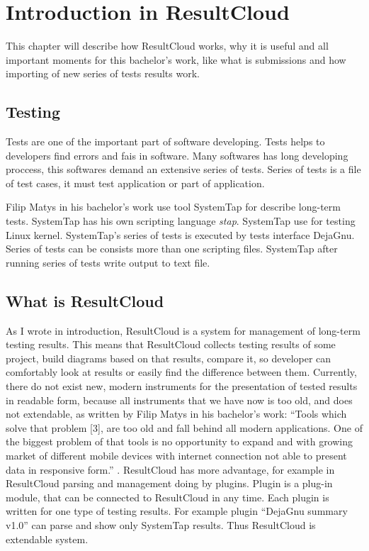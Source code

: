 \chapter{Introduction in ResultCloud}
\label{ch:resultcloud}

This chapter will describe how ResultCloud works, why it is useful and all important moments for this bachelor's work, like what is submissions and how importing of new series of tests results work.

\section{Testing}

Tests are one of the important part of software developing. Tests helps to developers find errors and fais in software. Many softwares has long developing proccess, this softwares demand an extensive series of tests. Series of tests is a file of test cases, it must test application or part of application.

Filip Matys in his bachelor's work use tool SystemTap for describe long-term tests. SystemTap has his own scripting language \emph{stap}. SystemTap use for testing Linux kernel. SystemTap's series of tests is executed by tests interface DejaGnu. Series of tests can be consists more than one scripting files. SystemTap after running series of tests write output to text file.  

\section{What is ResultCloud}

As I wrote in introduction, ResultCloud is a system for management of long-term testing results. This means that ResultCloud collects testing results of some project, build diagrams based on that results, compare it, so developer can comfortably look at results or easily find the difference between them. Currently, there do not exist new, modern instruments for the presentation of tested results in readable form, because all instruments that we have now is too old, and does not extendable, as written by Filip Matys in his bachelor's work: “Tools which solve that problem [3], are too old and fall behind all modern applications. One of the biggest problem of that tools is no opportunity to expand and with growing market of different mobile devices with internet connection not able to present data in responsive form.” \cite{filip}. ResultCloud has more advantage, for example in ResultCloud parsing and management doing by plugins. Plugin is a plug-in module, that can be connected to ResultCloud in any time. Each plugin is written for one type of testing results. For example plugin “DejaGnu summary v1.0” can parse and show only SystemTap results. Thus ResultCloud is extendable system.

